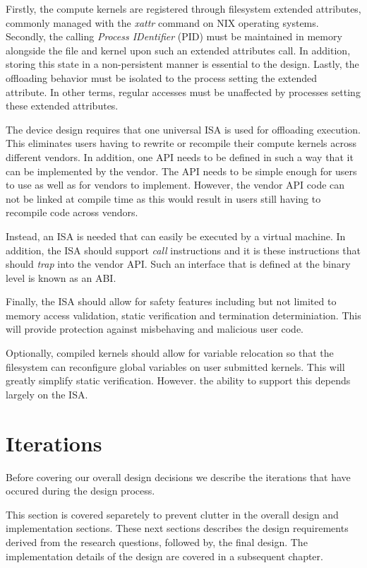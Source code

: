 Firstly, the compute kernels are registered through filesystem extended
attributes, commonly managed with the \textit{xattr} command on NIX operating
systems. Secondly, the calling \textit{Process IDentifier} (PID) must be
maintained in memory alongside the file and kernel upon such an extended
attributes call. In addition, storing this state in a non-persistent manner is
essential to the design. Lastly, the offloading behavior must be isolated to the
process setting the extended attribute. In other terms, regular accesses must
be unaffected by processes setting these extended attributes.

The device design requires that one universal ISA is used for offloading
execution. This eliminates users having to rewrite or recompile their compute
kernels across different vendors. In addition, one API needs to be defined in
such a way that it can be implemented by the vendor. The API needs to be
simple enough for users to use as well as for vendors to implement. However, the
vendor API code can not be linked at compile time as this would result in users
still having to recompile code across vendors.

Instead, an ISA is needed that can easily be executed by a virtual machine. In
addition, the ISA should support \textit{call} instructions and it is these
instructions that should \textit{trap} into the vendor API. Such an interface
that is defined at the binary level is known as an ABI.

Finally, the ISA should allow for safety features including but not limited to 
memory access validation, static verification and termination determiniation.
This will provide protection against misbehaving and malicious user code.

Optionally, compiled kernels should allow for variable relocation so that the
filesystem can reconfigure global variables on user submitted kernels. This
will greatly simplify static verification. However. the ability to support this
depends largely on the ISA.

\section{Iterations}

Before covering our overall design decisions we describe the iterations that
have occured during the design process.

This section is covered separetely to prevent clutter in the overall design and
implementation sections. These next sections describes the design requirements
derived from the research questions, followed by, the final design. The
implementation details of the design are covered in a subsequent chapter.

